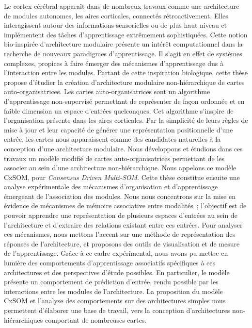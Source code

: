 \documentclass[11pt]{thesul-cs}
\begin{document}
\dominitoc

\begin{ThesisAbstract}
  \begin{FrenchAbstract}
Le cortex cérébral apparaît dans de nombreux travaux comme une architecture de modules autonomes, les aires corticales, connectés rétroactivement. Elles interagissent autour des informations sensorielles ou de plus haut niveau et implémentent des tâches d'apprentissage extrêmement sophistiquées. Cette notion bio-inspirée d'architecture modulaire présente un intérêt computationnel dans la recherche de nouveaux paradigmes d'apprentissage. Il s'agit en effet de systèmes complexes, propices à faire émerger des mécanismes d'apprentissage dus à l'interaction entre les modules.
Partant de cette inspiration biologique, cette thèse propose d'étudier la création d'architecture modulaire non-hiérarchique de cartes auto-organisatrices.
Les cartes auto-organisatrices sont un algorithme d'apprentissage non-supervisé permettant de représenter de façon ordonnée et en faible dimension un espace d'entrées quelconques. Cet algorithme s'inspire de l'organisation présente dans les aires corticales. 
Par la simplicité de leurs règles de mise à jour et leur capacité de générer une représentation positionnelle d'une entrée, les cartes nous apparaissent comme des candidates naturelles à la conception d'une architecture modulaire.
Nous développons et étudions dans ces travaux un modèle modifié de cartes auto-organisatrices permettant de les associer au sein d'une architecture non-hiérarchique. Nous appelons ce modèle CxSOM, pour \emph{Consensus Driven Multi-SOM}.
Cette thèse constitue ensuite une analyse expérimentale des mécanismes d'organisation et d'apprentissage émergeant de l'association des modules. Nous nous concentrons sur la mise en évidence de mécanismes de mémoire associative entre modalités~; l'objectif est de pouvoir apprendre une représentation de plusieurs espaces d'entrées au sein de l'architecture et d'extraire des relations existant entre ces entrées.
Pour analyser ces mécanismes, nous mettons l'accent sur une méthode de représentation des réponses de l'architecture, et proposons des outils de visualisation et de mesure de l'apprentissage. Grâce à ce cadre expérimental, nous avons pu mettre en lumière des comportements d'apprentissage associatifs spécifiques à ces architectures et des perspectives d'étude possibles.
En particulier, le modèle présente un comportement de prédiction d'entrée, rendu possible par les interactions entre les modules de l'architecture.
La proposition du modèle CxSOM et l'analyse des comportements sur des architectures simples nous permettent d'élaborer une base de travail, vers la conception d'architectures non-hiérarchiques comportant de nombreuses cartes.


\end{FrenchAbstract}
\end{ThesisAbstract}
\end{document}
